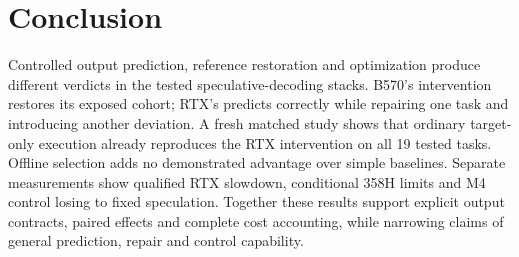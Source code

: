 \section{Conclusion}
\label{sec:conclusion}
Controlled output prediction, reference restoration and optimization produce different verdicts in the tested speculative-decoding stacks. B570's intervention restores its exposed cohort; RTX's predicts correctly while repairing one task and introducing another deviation. A fresh matched study shows that ordinary target-only execution already reproduces the RTX intervention on all 19 tested tasks. Offline selection adds no demonstrated advantage over simple baselines. Separate measurements show qualified RTX slowdown, conditional 358H limits and M4 control losing to fixed speculation. Together these results support explicit output contracts, paired effects and complete cost accounting, while narrowing claims of general prediction, repair and control capability.
